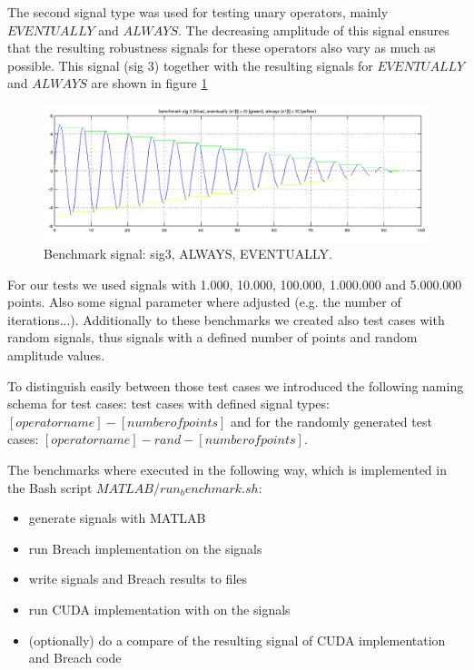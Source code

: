 \documentclass[a4paper,10pt]{article}
\begin{document}
The second signal type was used for testing unary operators, mainly $EVENTUALLY$ and $ALWAYS$. The decreasing amplitude of this signal ensures that the resulting robustness signals for these operators also vary as much as possible. This signal (sig 3) together with the resulting signals for $EVENTUALLY$ and $ALWAYS$ are shown in figure \ref{fig:sig3_evtl_alw}

\begin{figure}[H]
    \includegraphics[scale=0.3]{bm_sig3_ev_alw.png}
    \caption{
        \label{fig:sig3_evtl_alw}
        Benchmark signal: sig3, ALWAYS, EVENTUALLY.}
\end{figure}

For our tests we used signals with 1.000, 10.000, 100.000, 1.000.000 and 5.000.000 points. Also some signal parameter where adjusted (e.g. the number of iterations...). 
Additionally to these benchmarks we created also test cases with random signals, thus signals with a defined number of points and random amplitude values. 

To distinguish easily between those test cases we introduced the following naming schema for test cases: test cases with defined signal types: $[operator name]-[number of points]$ and for the randomly generated test cases: $[operator name]-rand-[number of points]$.

The benchmarks where executed in the following way, which is implemented in the Bash script $MATLAB/run_benchmark.sh$:
\begin{itemize}
	\item generate signals with MATLAB 
	\item run Breach implementation on the signals
	\item write signals and Breach results to files
	\item run CUDA implementation with on the signals
	\item (optionally) do a compare of the resulting signal of CUDA implementation and Breach code
\end{itemize}
\end{document}
